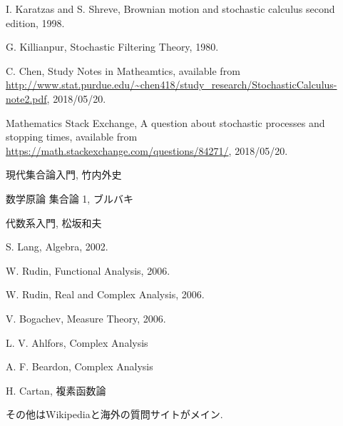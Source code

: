 \begin{thebibliography}{数字}
	 I. Karatzas and S. Shreve, Brownian motion and stochastic calculus second edition, 1998.
	
	 G. Killianpur, Stochastic Filtering Theory, 1980. 
	
	 C. Chen, Study Notes in Matheamtics, available from \url{http://www.stat.purdue.edu/~chen418/study_research/StochasticCalculus-note2.pdf}, 2018/05/20.

	 Mathematics Stack Exchange, A question about stochastic processes and stopping times, available from \url{https://math.stackexchange.com/questions/84271/}, 2018/05/20.
	
	 現代集合論入門, 竹内外史
	
	 数学原論 集合論 1, ブルバキ
	
	 代数系入門, 松坂和夫
	
	 S. Lang, Algebra, 2002.
	
	 W. Rudin, Functional Analysis, 2006.
	
	 W. Rudin, Real and Complex Analysis, 2006.
	
	 V. Bogachev, Measure Theory, 2006.
	
	 L. V. Ahlfors, Complex Analysis
	
	 A. F. Beardon, Complex Analysis
	
	 H. Cartan, 複素函数論
	
	 その他はWikipediaと海外の質問サイトがメイン.
\end{thebibliography}